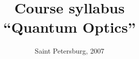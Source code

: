 \title{Course syllabus \\ ``Quantum Optics''}
\author{}
\date{Saint Petersburg, 2007}
\maketitle
\newpage